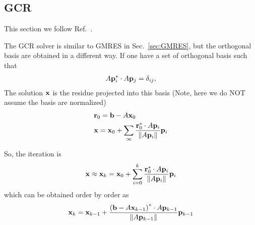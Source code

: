 \subsection{\label{sec:GCR}GCR}

This section we follow Ref.~\cite{sparselinearbook1}.

The GCR solver is similar to GMRES in Sec.~\ref{sec:GMRES}, but the orthogonal basis are obtained in a different way. If one have a set of orthogonal basis such that
\begin{equation}
\begin{split}
&A{\bf p}_i^*\cdot A{\bf p}_j=\delta _{ij},\\
\end{split}
\end{equation}
The solution ${\bf x}$ is the residue projected into this basis (Note, here we do NOT assume the basis are normalized)
\begin{equation}
\begin{split}
&{\bf r}_0={\bf b}-A{\bf x}_0\\
&{\bf x}={\bf x}_0+\sum _{\infty} \frac{{\bf r}_0^*\cdot A{\bf p}_i}{\|A{\bf p}_i\|}{\bf p}_i\\
\end{split}
\end{equation}

So, the iteration is
\begin{equation}
\begin{split}
&{\bf x}\approx {\bf x}_k={\bf x}_0+\sum _{i=0}^k \frac{{\bf r}_0^*\cdot A{\bf p}_i}{\|A{\bf p}_i\|}{\bf p}_i\\
\end{split}
\end{equation}
which can be obtained order by order as
\begin{equation}
\begin{split}
&{\bf x}_k={\bf x}_{k-1}+\frac{\left({\bf b}-A{\bf x}_{k-1}\right)^*\cdot A{\bf p}_{k-1}}{\|A{\bf p}_{k-1}\|}{\bf p}_{k-1}\\
\end{split}
\end{equation}

